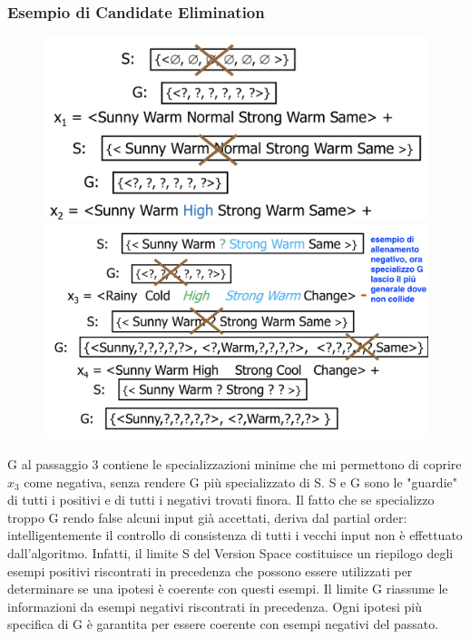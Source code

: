 \documentclass{article}
\begin{document}
\subsubsection{Esempio di Candidate Elimination}
\begin{figure}[H]
    \centering
    \includegraphics[scale=0.4]{Images/candidateelim1.png}
    \includegraphics[scale=0.4]{Images/candidateelim2.png}
\end{figure}
G al passaggio 3 contiene le specializzazioni minime che mi permettono di coprire $x_3$ come negativa, senza rendere G più specializzato di S. S e G sono le "guardie" di tutti i positivi e di tutti i negativi trovati finora. Il fatto che se specializzo troppo G rendo false alcuni input già accettati, deriva dal partial order: intelligentemente il controllo di consistenza di tutti i vecchi input non è effettuato dall'algoritmo. Infatti, il limite S del Version Space costituisce un riepilogo degli esempi positivi riscontrati in precedenza che possono essere utilizzati per determinare se una ipotesi è coerente con questi esempi. Il limite G riassume le informazioni da esempi negativi riscontrati in precedenza. Ogni ipotesi più specifica di G è garantita per essere coerente con esempi negativi del passato.
\clearpage 
\end{document}
